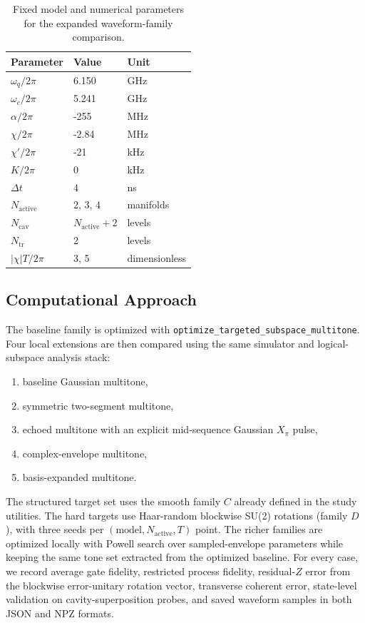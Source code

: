 \documentclass[aps,pra,twocolumn,reprint,floatfix,amsmath,amssymb]{revtex4-2}
\begin{document}
\begin{table}[t]
    \centering
    \caption{Fixed model and numerical parameters for the expanded waveform-family comparison.}
    \label{tab:params}
    \begin{tabular}{@{}lll@{}}
        \toprule
        Parameter & Value & Unit \\
        \midrule
        $\omega_q/2\pi$ & 6.150 & GHz \\
        $\omega_c/2\pi$ & 5.241 & GHz \\
        $\alpha/2\pi$ & -255 & MHz \\
        $\chi/2\pi$ & -2.84 & MHz \\
        $\chi'/2\pi$ & -21 & kHz \\
        $K/2\pi$ & 0 & kHz \\
        $\Delta t$ & 4 & ns \\
        $N_{\mathrm{active}}$ & 2, 3, 4 & manifolds \\
        $N_{\mathrm{cav}}$ & $N_{\mathrm{active}} + 2$ & levels \\
        $N_{\mathrm{tr}}$ & 2 & levels \\
        $|\chi|T/2\pi$ & 3, 5 & dimensionless \\
        \bottomrule
    \end{tabular}
\end{table}

\subsection{Computational Approach}
The baseline family is optimized with \texttt{optimize\_targeted\_subspace\_multitone}. Four local extensions are then compared using the same simulator and logical-subspace analysis stack:
\begin{enumerate}
    \item baseline Gaussian multitone,
    \item symmetric two-segment multitone,
    \item echoed multitone with an explicit mid-sequence Gaussian $X_\pi$ pulse,
    \item complex-envelope multitone,
    \item basis-expanded multitone.
\end{enumerate}
The structured target set uses the smooth family $C$ already defined in the study utilities. The hard targets use Haar-random blockwise SU(2) rotations (family $D$), with three seeds per $(\text{model}, N_{\mathrm{active}}, T)$ point. The richer families are optimized locally with Powell search over sampled-envelope parameters while keeping the same tone set extracted from the optimized baseline. For every case, we record average gate fidelity, restricted process fidelity, residual-$Z$ error from the blockwise error-unitary rotation vector, transverse coherent error, state-level validation on cavity-superposition probes, and saved waveform samples in both JSON and NPZ formats.
\end{document}
